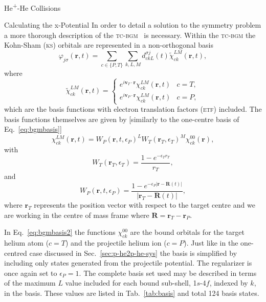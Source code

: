 \documentclass[letterpaper, 11 pt]{report}
\begin{document}
\begin{chapter}{\texorpdfstring{He\textsuperscript{+}}{He+}-He Collisions \label{chap:hephe}}
\begin{section}{Calculating the x-Potential \label{sec:pot}}
      In order to detail a solution to the symmetry problem a more thorough description of the
      \textsc{tc-bgm}~\cite{tcbgm} is necessary. Within the \textsc{tc-bgm} the Kohn-Sham (\textsc{ks})
      orbitals are represented in a non-orthogonal basis
      \begin{equation} \label{eq:bgmexp}
         \varphi_{j \sigma}(\mathbf{r},t) = \sum\limits_{c \in \{P, T\}} \sum\limits_{k, L, M}
                               d_{c k L}^{\sigma j}(t) \tilde{\chi}^{LM}_{c k}(\mathbf{r},t),
      \end{equation}
      where
      \begin{equation} \label{eq:etfbasis}
         \tilde{\chi}^{L M}_{ck}(\mathbf{r},t) =
            \begin{cases}
               e^{i \mathbf{v}_T \cdot \mathbf{r}} {\chi}^{L M}_{c k}(\mathbf{r},t) & c = T, \\[2ex]
               e^{i \mathbf{v}_P \cdot \mathbf{r}} {\chi}^{L M}_{c k}(\mathbf{r},t) & c = P,
            \end{cases}
      \end{equation}
      which are the basis functions with electron translation factors (\textsc{etf}) included. The basis
      functions themselves are given by [similarly to the one-centre basis of Eq.~\eqref{eq:bgmbasis}]
      \begin{equation} \label{eq:bgmbasis2}
         \chi^{LM}_{ck} (\mathbf{r},t)
         = W_P( \mathbf{r},t, \epsilon_P)^L W_T(\mathbf{r}_T,\epsilon_T)^M \chi^{00}_{ck}(\mathbf{r}),
      \end{equation}
      with
      \begin{equation}
         W_T(\mathbf{r}_T,\epsilon_T) = \frac{1 - e^{-\epsilon_T r_T}}{r_T},
      \end{equation}
      and
      \begin{equation}
         W_P (\mathbf{r},t,\epsilon_P)
         = \frac{1 - e^{-\epsilon_P|\mathbf{r} - \mathbf{R}(t)|}}{|\mathbf{r}_T - \mathbf{R}(t)|},
      \end{equation}
      where $\mathbf{r}_T$ represents the position vector with respect to the target centre and we are
      working in the centre of mass frame where $\mathbf{R} = \mathbf{r}_T - \mathbf{r}_P$.

      In Eq.~\eqref{eq:bgmbasis2} the functions $\chi^{00}_{ck}$ are the bound orbitals for the target
      helium atom ($c = T$) and the projectile helium ion ($c = P$). Just like in the one-centred case
      discussed in Sec.~\ref{sec:p-he2p-he-sys} the basis is simplified by including only states
      generated from the projectile potential. The regularizer is once again set to $\epsilon_P = 1$.
      The complete basis set used may be described in terms of the maximum $L$ value included for each
      bound sub-shell, 1$s$-4$f$, indexed by $k$, in the basis. These values are listed in
      Tab.~\ref{tab:basis} and total 124 basis states.


\end{section}
\end{chapter}
\end{document}
